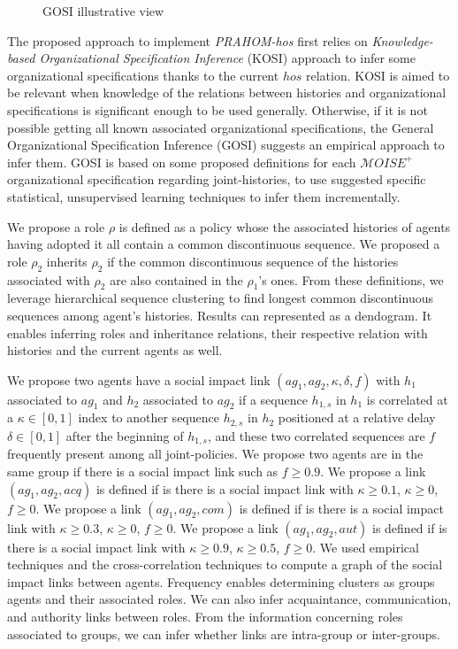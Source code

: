 \documentclass{ecai}
\newcounter{relation}
\begin{document}
\begin{figure}
    \centering
    
    \caption{GOSI illustrative view}
    \label{fig:gosi_illustrative_view}
\end{figure}

The proposed approach to implement \emph{PRAHOM-hos} first relies on \emph{Knowledge-based Organizational Specification Inference} (KOSI) approach to infer some organizational specifications thanks to the current $hos$ relation. KOSI is aimed to be relevant when knowledge of the relations between histories and organizational specifications is significant enough to be used generally.
Otherwise, if it is not possible getting all known associated organizational specifications, the General Organizational Specification Inference (GOSI) suggests an empirical approach to infer them. GOSI is based on some proposed definitions for each $\mathcal{M}OISE^+$ organizational specification regarding joint-histories, to use suggested specific statistical, unsupervised learning techniques to infer them incrementally.

We propose a role $\rho$ is defined as a policy whose the associated histories of agents having adopted it all contain a common discontinuous sequence. We proposed a role $\rho_2$ inherits $\rho_2$ if the common discontinuous sequence of the histories associated with $\rho_2$ are also contained in the $\rho_1$'s ones.
From these definitions, we leverage hierarchical sequence clustering to find longest common discontinuous sequences among agent's histories. Results can represented as a dendogram. It enables inferring roles and inheritance relations, their respective relation with histories and the current agents as well.

We propose two agents have a social impact link $(ag_1,ag_2, \kappa, \delta, f)$ with $h_1$ associated to $ag_1$ and $h_2$ associated to $ag_2$ if a sequence $h_{1,s}$ in $h_1$ is correlated at a $\kappa \in [0,1]$ index to another sequence $h_{2,s}$ in $h_2$ positioned at a relative delay $\delta \in [0,1]$ after the beginning of $h_{1,s}$, and these two correlated sequences are $f$ frequently present among all joint-policies.
We propose two agents are in the same group if there is a social impact link such as $f \geq 0.9$.
We propose a link $(ag_1,ag_2,acq)$ is defined if is there is a social impact link with $\kappa \geq 0.1$, $\kappa \geq 0$, $f \geq 0$.
We propose a link $(ag_1,ag_2,com)$ is defined if is there is a social impact link with $\kappa \geq 0.3$, $\kappa \geq 0$, $f \geq 0$.
We propose a link $(ag_1,ag_2,aut)$ is defined if is there is a social impact link with $\kappa \geq 0.9$, $\kappa \geq 0.5$, $f \geq 0$.
We used empirical techniques and the cross-correlation techniques to compute a graph of the social impact links between agents. Frequency enables determining clusters as groups agents and their associated roles. We can also infer acquaintance, communication, and authority links between roles. From the information concerning roles associated to groups, we can infer whether links are intra-group or inter-groups.
\end{document}
